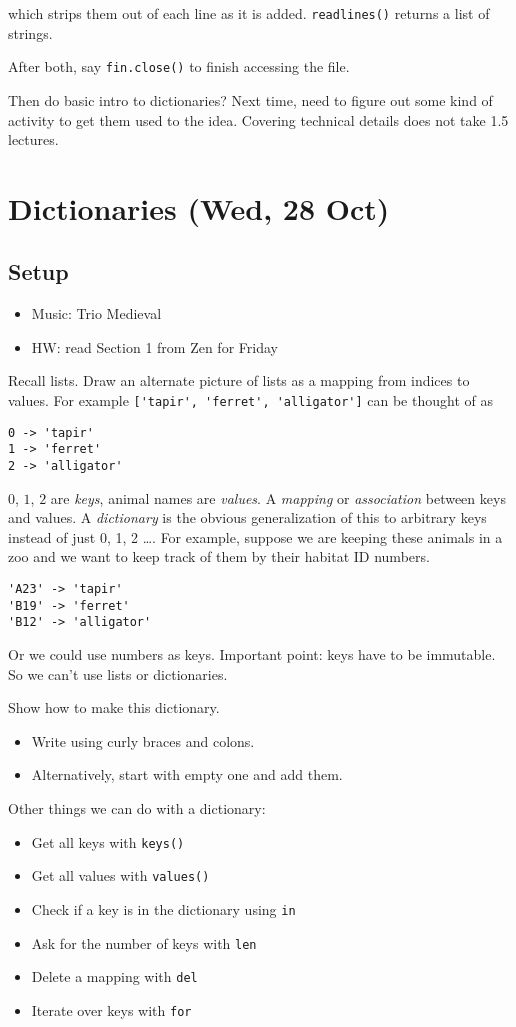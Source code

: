\documentclass{article}
\begin{document}
which strips them out of each line as it is added. \verb|readlines()|
returns a list of strings.

After both, say \verb|fin.close()| to finish accessing the file.

Then do basic intro to dictionaries?  Next time, need to figure out
some kind of activity to get them used to the idea.  Covering
technical details does not take 1.5 lectures.

\newpage

\section*{Dictionaries (Wed, 28 Oct)}

\subsection*{Setup}
\begin{itemize}
\item Music: Trio Medieval
\item HW: read Section 1 from Zen for Friday
\end{itemize}

Recall lists.  Draw an alternate picture of lists as a mapping from
indices to values. For example \verb|['tapir', 'ferret', 'alligator']|
can be thought of as
\begin{verbatim}
0 -> 'tapir'
1 -> 'ferret'
2 -> 'alligator'
\end{verbatim}
$0$, $1$, $2$ are \emph{keys}, animal names are \emph{values}.  A
\emph{mapping} or \emph{association} between keys and values.  A
\emph{dictionary} is the obvious generalization of this to arbitrary
keys instead of just 0, 1, 2 \dots.  For example, suppose we are
keeping these animals in a zoo and we want to keep track of them by
their habitat ID numbers.
\begin{verbatim}
'A23' -> 'tapir'
'B19' -> 'ferret'
'B12' -> 'alligator'
\end{verbatim}
Or we could use numbers as keys.  Important point: keys have to be
immutable.  So we can't use lists or dictionaries.

Show how to make this dictionary.
\begin{itemize}
\item Write using curly braces and colons.
\item Alternatively, start with empty one and add them.
\end{itemize}
Other things we can do with a dictionary:
\begin{itemize}
\item Get all keys with \verb|keys()|
\item Get all values with \verb|values()|
\item Check if a key is in the dictionary using \verb|in|
\item Ask for the number of keys with \verb|len|
\item Delete a mapping with \verb|del|
\item Iterate over keys with \verb|for|
\end{itemize}
\end{document}
